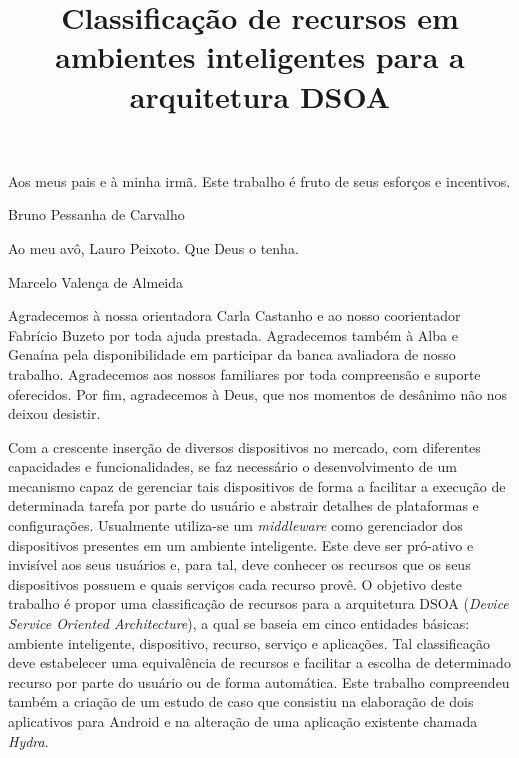 \documentclass[bacharelado]{unb-cic}
\title{Classificação de recursos em ambientes inteligentes para a arquitetura DSOA}
\begin{document}
  \lstset{tabsize=4}
  \renewcommand\lstlistingname{Listagem}
  \renewcommand\lstlistlistingname{Listagens}
  \maketitle
  \pretextual

  \begin{dedicatoria}
  Aos meus pais e à minha irmã. Este trabalho é fruto de seus esforços e incentivos.
  \begin{flushright}Bruno Pessanha de Carvalho\end{flushright}

  Ao meu avô, Lauro Peixoto. Que Deus o tenha.
  \begin{flushright}Marcelo Valença de Almeida\end{flushright}
  \end{dedicatoria}

  \begin{agradecimentos}
  Agradecemos à nossa orientadora \dr[a] Carla Castanho e ao nosso coorientador Fabrício Buzeto por toda ajuda prestada. Agradecemos também à \dr[a] Alba e \dr[a] Genaína pela disponibilidade em participar da banca avaliadora de nosso trabalho. Agradecemos aos nossos familiares por toda compreensão e suporte oferecidos. Por fim, agradecemos à Deus, que nos momentos de desânimo não nos deixou desistir.
  \end{agradecimentos}

  \begin{resumo}
  Com a crescente inserção de diversos dispositivos no mercado, com diferentes capacidades e funcionalidades, se faz necessário o desenvolvimento de um mecanismo capaz de gerenciar tais dispositivos de forma a facilitar a execução de determinada tarefa por parte do usuário e abstrair detalhes de plataformas e configurações. Usualmente utiliza-se um \emph{middleware} como gerenciador dos dispositivos presentes em um ambiente inteligente. Este deve ser pró-ativo e invisível aos seus usuários e, para tal, deve conhecer os recursos que os seus dispositivos possuem e quais serviços cada recurso provê. O objetivo deste trabalho é propor uma classificação de recursos para a arquitetura DSOA (\emph{Device Service Oriented Architecture}), a qual se baseia em cinco entidades básicas: ambiente inteligente, dispositivo, recurso, serviço e aplicações. Tal classificação deve estabelecer uma equivalência de recursos e facilitar a escolha de determinado recurso por parte do usuário ou de forma automática. Este trabalho compreendeu também a criação de um estudo de caso que consistiu na elaboração de dois aplicativos para Android e na alteração de uma aplicação existente chamada \emph{Hydra}. 
  \end{resumo}
\end{document}
